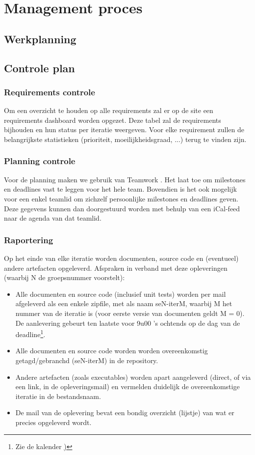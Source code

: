 \section {Management proces} 

\subsection{Werkplanning}

\subsection{Controle plan}
\subsubsection{Requirements controle}
Om een overzicht te houden op alle requirements zal er op de site \cite{Website} een requirements dashboard worden opgezet. Deze tabel zal de requirements bijhouden en hun status per iteratie weergeven. Voor elke requirement zullen de belangrijkste statistieken (prioriteit, moeilijkheidsgraad, ...) terug te vinden zijn.

\subsubsection{Planning controle}

Voor de planning maken we gebruik van Teamwork \cite{Teamwork}. Het laat toe om milestones en deadlines vast te leggen voor het hele team. Bovendien is het ook mogelijk voor een enkel teamlid om zichzelf persoonlijke milestones en deadlines geven. Deze gegevens kunnen dan doorgestuurd worden met behulp van een iCal-feed naar de  agenda van dat teamlid. 

\subsubsection{Raportering}

Op het einde van elke iteratie worden documenten, source code en (eventueel) andere artefacten opgeleverd.
Afspraken in verband met deze opleveringen (waarbij N de groepsnummer voorstelt): 

\begin{itemize}
\item Alle documenten en source code (inclusief unit tests) worden per mail afgeleverd als een
enkele zipfile, met als naam seN-iterM, waarbij M het nummer van de iteratie is (voor
eerste versie van documenten geldt M = 0). De aanlevering gebeurt ten laatste voor 9u00 ’s
ochtends op de dag van de deadline\footnote{Zie de kalender \href{tab:kalender})}.
\item Alle documenten en source code worden worden overeenkomstig getagd/gebranchd (seN-iterM)
in de repository.
\item Andere artefacten (zoals executables) worden apart aangeleverd (direct, of via een link, in de
opleveringsmail) en vermelden duidelijk de overeenkomstige iteratie in de bestandsnaam.
\item De mail van de oplevering bevat een bondig overzicht (lijstje) van wat er precies opgeleverd
wordt.
\end{itemize}

